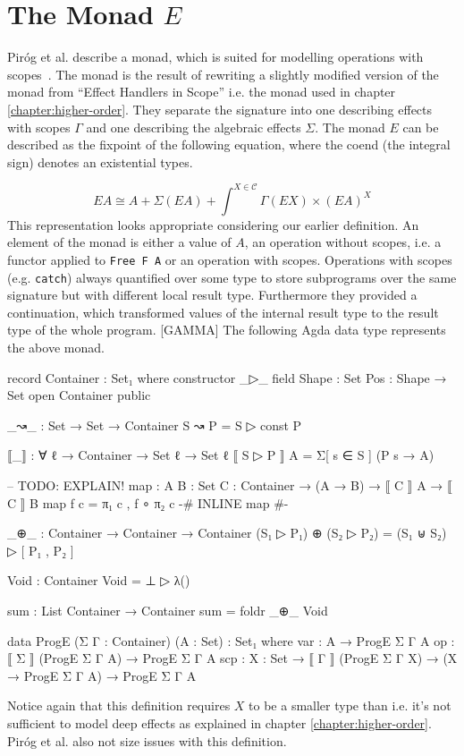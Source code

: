 \section{The Monad $E$}

Piróg et al. describe a monad, which is suited for modelling operations with
scopes~\cite{DBLP:conf/lics/PirogSWJ18}.
The monad is the result of rewriting a slightly modified version of the monad
from ``Effect Handlers in Scope'' i.e. the monad used in chapter
\ref{chapter:higher-order}.
They separate the signature into one describing effects with scopes $\Gamma$ and
one describing the algebraic effects $\Sigma$.
The monad $E$ can be described as the fixpoint of the following equation, where
the coend (the integral sign) denotes an existential types.

\[
  EA \cong A + \Sigma{}(EA) + \int^{X\in\mathscr{C}} \Gamma{}(EX) \times (EA)^X
\]
This representation looks appropriate considering our earlier definition.
An element of the monad is either a value of $A$, an operation without scopes,
i.e. a functor applied to \texttt{Free F A} or an operation with scopes.
Operations with scopes (e.g. \texttt{catch}) always quantified over some type to
store subprograms over the same signature but with different local result type.
Furthermore they provided a continuation, which transformed values of the
internal result type to the result type of the whole program.
[GAMMA]
The following Agda data type represents the above monad.

\begin{code}[hide]
record Container : Set₁ where
  constructor _▷_
  field
    Shape : Set
    Pos : Shape → Set
open Container public

_↝_ : Set → Set → Container
S ↝ P = S ▷ const P

⟦_⟧ : ∀ {ℓ} → Container → Set ℓ → Set ℓ
⟦ S ▷ P ⟧ A = Σ[ s ∈ S ] (P s → A)

-- TODO: EXPLAIN!
map : {A B : Set} {C : Container} → (A → B) → ⟦ C ⟧ A → ⟦ C ⟧ B
map f c = π₁ c , f ∘ π₂ c
{-# INLINE map #-}

_⊕_ : Container → Container → Container
(S₁ ▷ P₁) ⊕ (S₂ ▷ P₂) = (S₁ ⊎ S₂) ▷ [ P₁ , P₂ ]

Void : Container
Void = ⊥ ▷ λ()

sum : List Container → Container
sum = foldr _⊕_ Void

\end{code}
\begin{code}
data ProgE (Σ Γ : Container) (A : Set) : Set₁ where
  var  : A → ProgE Σ Γ A
  op   : ⟦ Σ ⟧ (ProgE Σ Γ A) → ProgE Σ Γ A
  scp  : {X : Set} → ⟦ Γ ⟧ (ProgE Σ Γ X) → (X → ProgE Σ Γ A) → ProgE Σ Γ A
\end{code}
Notice again that this definition requires $X$ to be a smaller type than
 i.e. it's not sufficient to model deep effects as explained in
chapter \ref{chapter:higher-order}.
Piróg et al. also not size issues with this definition.


